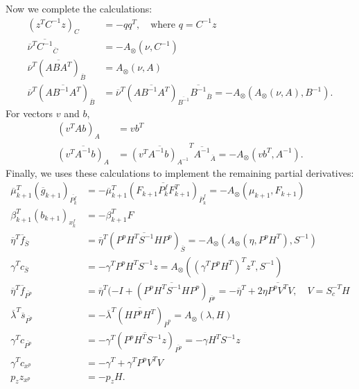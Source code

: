 \documentclass[10pt,fleqn]{article}
\renewcommand{\vec}[1]{\ensuremath{\overline{#1}}}
\begin{document}
Now we complete the calculations:
\begin{align*}
  (z^T C^{-1} z)_C &= -q q^T, \quad \text{where $q = C^{-1} z$} \\
  \vec\nu^T \vec{C^{-1}}_{\vec C} &= -A_{\otimes}(\nu, C^{-1}) \\
  \vec\nu^T (\vec{A B A^T})_{\vec B} &= A_{\otimes}(\nu, A) \\
  \vec\nu^T (\vec{A B^{-1} A^T})_{\vec B}
    &= \vec\nu^T (\vec{A B^{-1} A^T})_{\vec{B^{-1}}} \vec{B^{-1}}_{\vec B}
    = -A_{\otimes}( A_{\otimes}(\nu, A), B^{-1}).
\end{align*}
For vectors $v$ and $b$,
\begin{align*}
  (v^T A b)_A &= v b^T \\
  \vec{(v^T A^{-1} b)_A}
    &= \vec{(v^T A^{-1} b)_{A^{-1}}}^T \vec{A^{-1}}_{\vec A}
    = -A_{\otimes}(v b^T , A^{-1}).
\end{align*}
Finally, we uses these calculations to implement the remaining partial
derivatives:
\begin{align*}
  \vec\mu_{k+1}^T (\vec g_{k+1})_{\vec{P^f_k}}
    &= -\vec\mu_{k+1}^T (\vec{F_{k+1} P^f_k F_{k+1}^T})_{\vec P^f_k}
    = -A_{\otimes}(\mu_{k+1}, F_{k+1}) \\
  \beta_{k+1}^T (b_{k+1})_{x^f_k} &= -\beta_{k+1}^T F \\
  \vec\eta^T \vec f_{\vec S}
    &= \vec\eta^T (\vec{P^p H^T S^{-1} H P^p})_{\vec S}
    = -A_{\otimes}( A_{\otimes}(\eta, P^p H^T), S^{-1}) \\
  \gamma^T c_{\vec S}
    &= -\gamma^T P^p H^T S^{-1} z
    = A_{\otimes}((\gamma^T P^p H^T)^T z^T, S^{-1}) \\
  \vec\eta^T \vec f_{\vec{P^p}}
    &= \vec\eta^T (-I + (\vec{P^p H^T S^{-1} H P^p})_{\vec{P^p}}
    = -\vec\eta^T + 2 \vec{\eta P^p V^T V}, \quad V = S_c^{-T} H \\
  \vec\lambda^T \vec s_{\vec{P^p}}
    &= -\vec\lambda^T (\vec{H P^p H^T})_{\vec P^p}
    = A_{\otimes}(\lambda, H) \\
  \gamma^T c_{\vec{P^p}}
    &= -\gamma^T (\vec{P^p H^T S^{-1} z})_{\vec{P^p}}
    = -\gamma H^T S^{-1} z \\
  \gamma^T c_{x^p} &= -\gamma^T + \gamma^T P^p V^T V \\
  p_z z_{x^p} &= -p_z H.
\end{align*}
\end{document}
